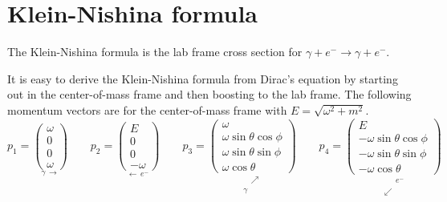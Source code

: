 

\section*{Klein-Nishina formula}

The Klein-Nishina formula is the lab frame cross section for
$\gamma+e^-\rightarrow\gamma+e^-$.

\begin{center}
\end{center}

It is easy to derive the Klein-Nishina formula from Dirac's equation by starting
out in the center-of-mass frame and then boosting to the lab frame.
The following momentum vectors are for the center-of-mass frame with $E=\sqrt{\omega^2+m^2}$.
\begin{equation*}
p_1=\underset{\gamma \, \longrightarrow}
{\begin{pmatrix}\omega\\0\\0\\ \omega\end{pmatrix}}
\qquad
p_2=\underset{\longleftarrow \, e^-}
{\begin{pmatrix}E\\0\\0\\-\omega\end{pmatrix}}
\qquad
p_3=\underset{\substack{\phantom{\gamma} \, \nearrow\\\gamma \, \phantom{\nearrow}}}
{\begin{pmatrix}
\omega\\
\omega\sin\theta\cos\phi\\
\omega\sin\theta\sin\phi\\
\omega\cos\theta
\end{pmatrix}}
\qquad
p_4=\underset{\substack{\phantom{\swarrow} \, e^-\\\swarrow \, \phantom{e^-}}}
{\begin{pmatrix}
E\\
-\omega\sin\theta\cos\phi\\
-\omega\sin\theta\sin\phi\\
-\omega\cos\theta
\end{pmatrix}}
\end{equation*}

